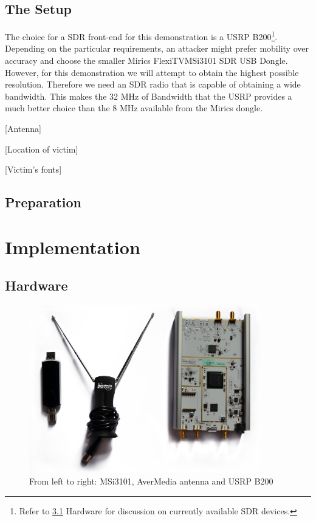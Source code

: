 \documentclass[a4paper,12pt,twoside,openright]{report}
\begin{document}
\section{The Setup}

The choice for a SDR front-end for this demonstration is a USRP B200\footnote{Refer to \ref{sec:hw} Hardware for discussion on currently available SDR devices.}. Depending on the particular requirements, an attacker might prefer mobility over accuracy and choose the smaller Mirics FlexiTV\texttrademark MSi3101 SDR USB Dongle. However, for this demonstration we will attempt to obtain the highest possible resolution. Therefore we need an SDR radio that is capable of obtaining a wide bandwidth. This makes the 32 MHz of Bandwidth that the USRP provides a much better choice than the 8 MHz available from the Mirics dongle.

[Antenna]

[Location of victim]

[Victim's fonts]

\section{Preparation}

\chapter{Implementation} 

\section{Hardware}
\label{sec:hw} 

\begin{figure}[h!]
 
  \centering
    \includegraphics[width=0.9\textwidth]{equipment}
    \caption{From left to right: MSi3101, AverMedia antenna and USRP B200}
\end{figure}
\end{document}
